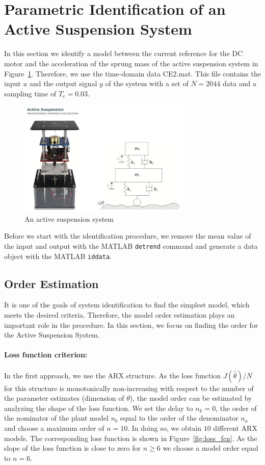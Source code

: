 
\section{Parametric Identification of an Active Suspension System}
In this section we identify a model between the current reference for the DC motor and the acceleration of the sprung mass of the active suspension system in Figure~\ref{fig:active_suspension}. 
Therefore, we use the time-domain data CE2.mat. This file contains the input $u$ and the output signal $y$ of the system with a set of $N = 2044$ data and a sampling time of $T_e = 0.03$. 
\begin{figure}[h]
	\centering
	\includegraphics[height=5.5cm]{figures/active_suspension.png}
	\caption{An active suspension system}\label{fig:active_suspension}
\end{figure}
Before we start with the identification procedure, we remove the mean value of the input and output with the MATLAB \texttt{detrend} command and generate a data object with the MATLAB \texttt{iddata}.

\subsection{Order Estimation}
It is one of the goals of system identification to find the simplest model, which meets the desired criteria. Therefore, the model order estimation plays an important role in the procedure. In this section, we focus on finding the order for the Active Suspension System. 

\paragraph{Loss function criterion:} In the first approach, we use the ARX structure. As the loss function $ J(\hat{\theta}) /N $ for this structure is monotonically non-increasing with respect to the number of the parameter estimates (dimension of $\theta$), the model order can be estimated by analyzing the shape of the loss function. We set the delay to $n_k = 0$, the order of the nominator of the plant model $n_b$ equal to the order of the denominator $n_a$ and choose a maximum order of $n=10$. In doing so, we obtain $10$ different ARX models. The corresponding loss function is shown in Figure~\ref{fig:loss_fcn}. 
As the slope of the loss function is close to zero for $n \geq 6 $ we choose a model order equal to $n = 6.$


